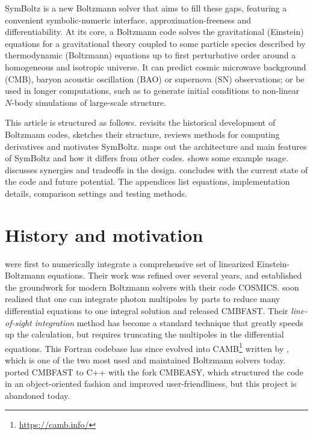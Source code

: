 \documentclass{aa}
\begin{document}
SymBoltz is a new Boltzmann solver that aims to fill these gaps, featuring a convenient symbolic-numeric interface, approximation-freeness and differentiability.
At its core, a Boltzmann code solves the gravitational (Einstein) equations for a gravitational theory coupled to some particle species described by thermodynamic (Boltzmann) equations up to first perturbative order around a homogeneous and isotropic universe.
It can predict cosmic microwave background (CMB), baryon acoustic oscillation (BAO) or supernova (SN) observations; or be used in longer computations, such as to generate initial conditions to non-linear $N$-body simulations of large-scale structure.

This article is structured as follows.
 revisits the historical development of Boltzmann codes, sketches their structure, reviews methods for computing derivatives and motivates SymBoltz.
 maps out the architecture and main features of SymBoltz and how it differs from other codes.
 shows some example usage.
 discusses synergies and tradeoffs in the design.
 concludes with the current state of the code and future potential.
The appendices list equations, implementation details, comparison settings and testing methods.

\section{History and motivation} %
\label{sec:intro}

\cite{peeblesPrimevalAdiabaticPerturbation1970} were first to numerically integrate a comprehensive set of linearized Einstein-Boltzmann equations.
Their work was refined over several years, and \cite{maCosmologicalPerturbationTheory1995} established the groundwork for modern Boltzmann solvers with their code COSMICS.
\cite{seljakLineSightApproach1996} soon realized that one can integrate photon multipoles by parts to reduce many differential equations to one integral solution and released CMBFAST.
Their \textit{line-of-sight integration} method has become a standard technique that greatly speeds up the calculation, but requires truncating the multipoles in the differential equations.
This Fortran codebase has since evolved into CAMB\footnote{\url{https://camb.info/}\iffalse / \url{https://github.com/cmbant/camb}\fi} written by \cite{lewisEfficientComputationCMB2000a}, which is one of the two most used and maintained Boltzmann solvers today.
\cite{doranCMBEASYObjectOriented2005} ported CMBFAST to C++ with the fork CMBEASY, which structured the code in an object-oriented fashion and improved user-friendliness, but this project is abandoned today.
\end{document}
